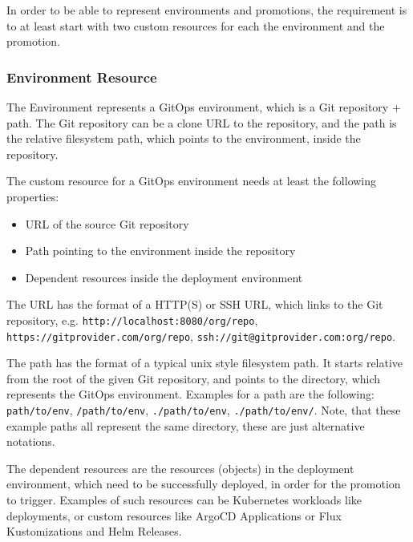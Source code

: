 In order to be able to represent environments and promotions,
the requirement is to at least start with two custom resources for each 
the environment and the promotion.

\subsubsection*{Environment Resource}

The Environment represents a GitOps environment,
which is a Git repository + path.
The Git repository can be a clone URL to the repository,
and the path is the relative filesystem path, which points to the 
environment, inside the repository.


The custom resource for a GitOps environment needs at least the following properties:

\begin{itemize}
	\item URL of the source Git repository
	\item Path pointing to the environment inside the repository
	\item Dependent resources inside the deployment environment
\end{itemize}

The URL has the format of a HTTP(S) or SSH URL,
which links to the Git repository, e.g.
\lstinline|http://localhost:8080/org/repo|,
\lstinline|https://gitprovider.com/org/repo|,
\lstinline|ssh://git@gitprovider.com:org/repo|.

The path has the format of a typical unix style filesystem path.
It starts relative from the root of the given Git repository,
and points to the directory, which represents the GitOps environment.
Examples for a path are the following:
\lstinline|path/to/env|,
\lstinline|/path/to/env|,
\lstinline|./path/to/env|,
\lstinline|./path/to/env/|.
Note, that these example paths all represent the same directory,
these are just alternative notations.

The dependent resources are the resources (objects) in the deployment environment,
which need to be successfully deployed, in order for the promotion to trigger.
Examples of such resources can be Kubernetes workloads like deployments,
or custom resources like ArgoCD Applications or Flux Kustomizations and Helm Releases.

